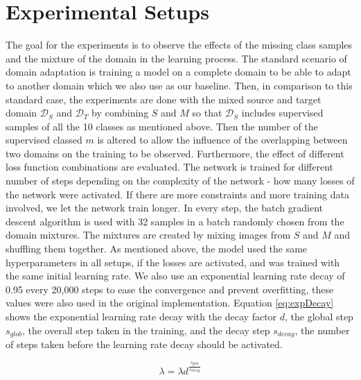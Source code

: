 \section{Experimental Setups} \label{sec:exSetups}
The goal for the experiments is to observe the effects of the missing class samples and the mixture of the domain in the learning process. The standard scenario of domain adaptation is training a model on a complete domain to be able to adapt to another domain which we also use as our baseline. Then, in comparison to this standard case, the experiments are done with the mixed source and target domain $\mathcal{D}_S$ and $\mathcal{D}_T$ by combining $S$ and $M$ so that $\mathcal{D}_S$ includes supervised samples of all the 10 classes as mentioned above. Then the number of the supervised classed $m$ is altered to allow the influence of the overlapping between two domains on the training to be observed. Furthermore, the effect of different loss function combinations are evaluated. 
The network is trained for different number of steps depending on the complexity of the network - how many losses of the network were activated. If there are more constraints and more training data involved, we let the network train longer. In every step, the batch gradient descent algorithm is used with 32 samples in a batch randomly chosen from the domain mixtures. The mixtures are created by mixing images from $S$ and $M$ and shuffling them together. As mentioned above, the model used the same hyperparameters in all setups, if the losses are activated, and was trained with the same initial learning rate. We also use an exponential learning rate decay of 0.95 every 20,000 steps to ease the convergence and prevent overfitting, these values were also used in the original implementation. Equation \eqref{eq:expDecay} shows the exponential learning rate decay with the decay factor $d$, the global step $s_{glob}$, the overall step taken in the training, and the decay step $s_{decay}$, the number of steps taken before the learning rate decay should be activated.

	\begin{equation} \label{eq:expDecay}
			\lambda = \lambda d^{\frac{s_{glob}}{s_{decay}}}
	\end{equation}

